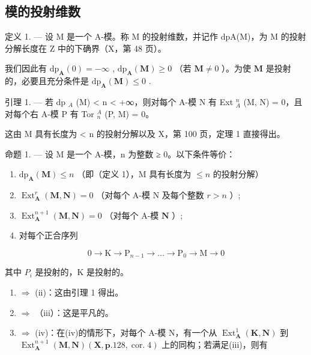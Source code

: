 \subsection{模的投射维数}

定义 1. --- 设 M 是一个 A-模。称 M 的投射维数，并记作 dpA(M)，为 M 的投射分解长度在 Z 中的下确界（X，第 48 页）。

我们因此有 \(\mathrm{dp}_{\mathbf{A}}(0) = -\infty\) , \(\mathrm{dp}_{\mathbf{A}}(\mathbf{M}) \geqslant 0\) （若 \(\mathbf{M} \neq 0\) ）。为使 \(\mathbf{M}\) 是投射的，必要且充分条件是 \(\mathrm{dp}_{\mathbf{A}}(\mathbf{M}) \leqslant 0\) .

引理 1. --- 若 dp \(_{A}\) (M) \textless{} n \textless{} +∞，则对每个 A-模 N 有 Ext \(_{A}^{n}\) (M, N) = 0，且对每个右 A-模 P 有 Tor \(_{n}^{A}\) (P, M) = 0。

这由 M 具有长度为 \textless{} n 的投射分解以及 X，第 100 页，定理 1 直接得出。

命题 1. --- 设 M 是一个 A-模，n 为整数 ≥ 0。以下条件等价：

\begin{enumerate}
\def\labelenumi{(\roman{enumi})}
\item
  \(\mathrm{dp}_{\mathbf{A}}(\mathbf{M}) \leqslant n\) （即（定义 1），M 具有长度为 \(\leqslant n\) 的投射分解）
\item
  \(\operatorname{Ext}_{\mathbf{A}}^{r}(\mathbf{M},\mathbf{N}) = 0\) （对每个 A-模 N 及每个整数 \(r > n\) ）;
\item
  \(\operatorname{Ext}_{\mathbf{A}}^{n+1}(\mathbf{M}, \mathbf{N}) = 0\) （对每个 A-模 \(\mathbf{N}\) ）;
\item
  对每个正合序列
\end{enumerate}

\[
0 \rightarrow \mathrm{K} \rightarrow \mathrm{P} _ {n - 1} \rightarrow \dots \rightarrow \mathrm{P} _ {0} \rightarrow \mathrm{M} \rightarrow 0
\]

其中 \(P_{i}\) 是投射的，K 是投射的。

\begin{enumerate}
\def\labelenumi{(\roman{enumi})}
\item
  \(\Rightarrow\) (ii)：这由引理 1 得出。
\item
  \(\Rightarrow\) （iii）：这是平凡的。
\item
  \(\Rightarrow\) (iv)：在(iv)的情形下，对每个 A-模 N，有一个从 \(\operatorname{Ext}_{\mathbf{A}}^{1}(\mathbf{K},\mathbf{N})\) 到 \(\operatorname{Ext}_{\mathbf{A}}^{n + 1}(\mathbf{M},\mathbf{N})(\mathbf{X},\mathbf{p}.128,\operatorname{cor.}4)\) 上的同构；若满足(iii)，则有
\end{enumerate}

